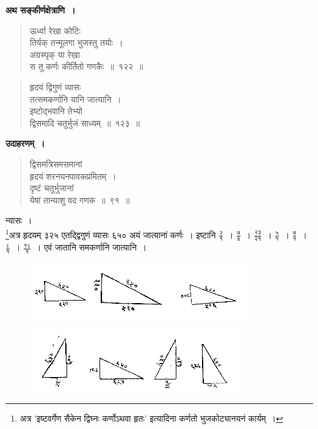 \documentclass[11pt, openany]{book}
\begin{document}
\textbf{अथ सङ्कीर्णक्षेत्राणि~।} 
 \begin{quote}
     \bs 
     ऊर्ध्वा रेखा कोटिः\\
तिर्यक् तन्मूलगा भुजस्तु तयोः~। \\
अग्रस्पृक् या रेखा \\
स तु कर्णः कीर्तितो गणकैः~॥~१२२~॥~
\end{quote}
 
\newpage

\begin{quote}
    \bs 
हृदयं द्विगुणं व्यासः\\
तत्समकर्णानि यानि जात्यानि~। \\
इष्टोद्भवानि तेभ्यो \\
द्विसमादि चतुर्भुजं साध्यम्~॥~१२३~॥~
\end{quote}

\textbf{उदाहरणम्~।} 
\begin{quote}
    \bqt 
     द्विसमत्रिसमसमानां \\
हृदयं शरनयनपावकप्रमितम्~। \\
दृष्टं चतुर्भुजानां \\
येषां तान्याशु वद गणक~॥~९१~॥~
\end{quote}

न्यासः~। \\

\vspace{-4mm}
\footnote{अत्र '{\color{violet}इष्टवर्गेण सैकेन द्विघ्नः कर्णोऽथवा हृतः}' इत्यादिना कर्णतो भुजकोट्यानयनं कार्यम्~।}अत्र हृदयम् ३२५ एतद्द्विगुणं व्यासः ६५० अयं जात्यानां कर्णः~। इष्टानि $\frac{\mbox{२}}{\mbox{१}}$~। $\frac{\mbox{७}}{\mbox{४}}$~। $\frac{\mbox{२३}}{\mbox{२१}}$~। $\frac{\mbox{५}}{\mbox{१}}$~। $\frac{\mbox{७}}{\mbox{१}}$~। $\frac{\mbox{८}}{\mbox{१}}$~। $\frac{\mbox{१८}}{\mbox{१}}$~। एवं जातानि समकर्णानि जात्यानि~। 
\vspace{-2mm}

\begin{figure}[h!]
         \centering
         \includegraphics[scale=0.85]{graphics/capture151.png}
     \end{figure}
\newpage%
\begin{figure}[h!]
         \centering
         \includegraphics[scale=0.85]{graphics/capture152.png}
     \end{figure}
\end{document}
